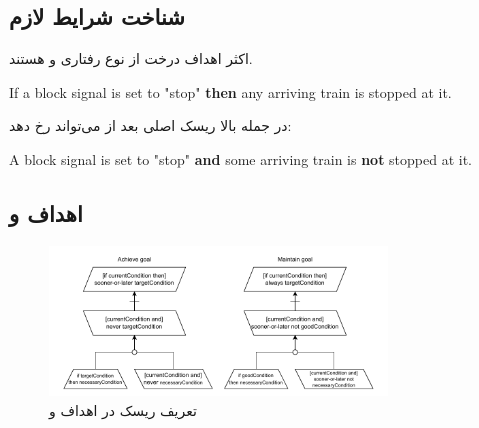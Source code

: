 \subsection{شناخت شرایط لازم}

اکثر اهداف درخت از نوع رفتاری  و  هستند.

\begin{LTR}
    If a block signal is set to "stop" \textbf{then} any arriving train is
    stopped at it.
\end{LTR}

در جمله بالا ریسک اصلی بعد از \textbf{} می‌تواند رخ دهد:

\begin{LTR}
    A block signal is set to "stop" \textbf{and} some arriving train is
    \textbf{not} stopped at it.
\end{LTR}

\subsection{اهداف  و }

\begin{figure}[H]
    \centering
    \includegraphics[width=0.8\textwidth]{assets/achieve_maintain_goal.drawio.pdf}
    \caption{تعریف ریسک در اهداف  و }
\end{figure}